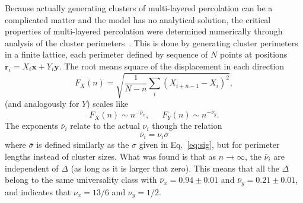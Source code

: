 Because actually generating clusters of multi-layered percolation can be a
complicated matter and the model has no analytical solution, the critical
properties of multi-layered percolation were determined numerically through
analysis of the cluster perimeters~\cite{Dayan1991, Samyr2009}. This is done by
generating cluster perimeters in a finite lattice, each perimeter defined by
sequence of $N$ points at positions $\mathbf{r}_i=X_i\mathbf{x}+Y_i\mathbf{y}$.
The root means square of the displacement in each direction
\begin{equation}
    F_{X}\left(n\right)=
    \sqrt{\frac{1}{N-n}\sum_{i}{\left(X_{i+n-1}-X_{i}\right)}^{2}},
\end{equation}
(and analogously for $Y$) scales like
\begin{equation}
    F_{X}\left(n\right)\sim n^{-\bar{\nu}_{x}},
    \,\,\,\,\,\,\,\,\,
    F_{Y}\left(n\right)\sim n^{-\bar{\nu}_{y}}.
\end{equation}
The exponents $\bar{\nu}_i$ relate to the actual $\nu_i$ though the relation
\begin{equation}
    \bar{\nu}_i = \nu_i \bar{\sigma}
\end{equation}
where $\bar{\sigma}$ is defined similarly as the $\sigma$ given in
Eq.~\ref{eq:sig}, but for perimeter lengths instead of cluster sizes.
What was found is that as $n\rightarrow\infty$, the $\bar{\nu}_i$ are
independent of $\Delta$ (as long as it is larger that zero).
This means that all the $\Delta$ belong to the same universality class
with $\bar{\nu}_x=0.94\pm0.01$ and $\bar{\nu}_y=0.21\pm0.01$, and
indicates that $\nu_x=13/6$ and $\nu_y=1/2$.



